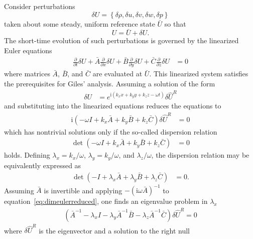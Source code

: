 \documentclass[letterpaper,11pt,nointlimits,reqno,draft]{amsart}
\newcommand{\ii}{\ensuremath{\mathrm{i}}}
\begin{document}
Consider perturbations
\[
\delta{}U = \left\{ \delta{}\rho, \delta{}u,
\delta{}v, \delta{}w, \delta{}p \right\}
\]
taken about some steady,
uniform reference state $\bar{U}$ so that
\[
U = \bar{U} + \delta{}U.
\]
The short-time evolution of such perturbations is governed by the linearized
Euler equations
\begin{align}
\label{eq:dimeulerperturb}
               \frac{\partial}{\partial{}t}\delta{}U
+ \bar{A} \frac{\partial}{\partial{}x}\delta{}U
+ \bar{B} \frac{\partial}{\partial{}y}\delta{}U
+ \bar{C} \frac{\partial}{\partial{}z}\delta{}U
&= 0
\end{align}
where matrices $\bar{A}$, $\bar{B}$, and $\bar{C}$ are evaluated
at $\bar{U}$.  This linearized system satisfies the prerequisites for
Giles' analysis.  Assuming a solution of the form
\begin{align}
  \delta{}U &= e^{\ii\left(
    k_x x + k_y y + k_z z - \omega t
  \right)}
  \delta\hat{U}^R
\end{align}
and substituting into the linearized equations reduces the equations to
\begin{align}
\label{eq:dimeulerreduced}
  \ii\left( - \omega I
            + k_x \bar{A}
            + k_y \bar{B}
            + k_z \bar{C}
  \right)
  \delta\hat{U}^R &= 0
\end{align}
which has nontrivial solutions only if the so-called dispersion relation
\begin{align}
  \det \left( - \omega I
              + k_x \bar{A}
              + k_y \bar{B}
              + k_z \bar{C}
       \right) &= 0
\end{align}
holds.  Defining $\lambda_x = k_x/\omega$, $\lambda_y = k_y/\omega$, and
$\lambda_z/\omega$, the dispersion relation may be equivalently expressed as
\begin{align}
\label{eq:dimeulerdisp}
  \det \left( - I
              + \lambda_x \bar{A}
              + \lambda_y \bar{B}
              + \lambda_z \bar{C}
       \right) &= 0
  .
\end{align}
Assuming $\bar{A}$ is invertible and applying
$-\left(\ii\omega{}\bar{A}\right)^{-1}$ to
equation~\eqref{eq:dimeulerreduced}, one finds an eigenvalue problem in
$\lambda_x$
\begin{align}
  \left(   \bar{A}^{-1}
         - \lambda_x I
         - \lambda_y \bar{A}^{-1} \bar{B}
         - \lambda_z \bar{A}^{-1} \bar{C}
  \right) \delta\hat{U}^R = 0
\end{align}
where $\delta\hat{U}^R$ is the eigenvector and a solution to the right null
\end{document}
